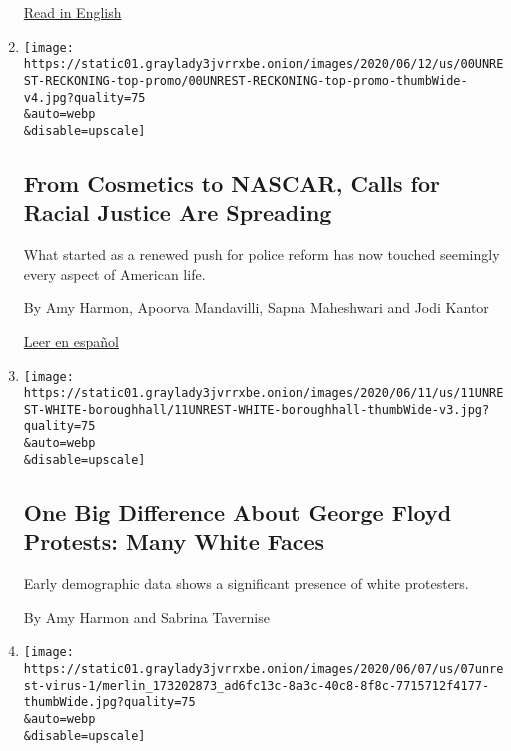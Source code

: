 \begin{enumerate}
  \href{https://www.nytimes3xbfgragh.onion/2020/06/13/us/george-floyd-racism-america.html}{Read
  in English}
\item
  \href{/2020/06/13/us/george-floyd-racism-america.html}{}

  \texttt{[image: https://static01.graylady3jvrrxbe.onion/images/2020/06/12/us/00UNREST-RECKONING-top-promo/00UNREST-RECKONING-top-promo-thumbWide-v4.jpg?quality=75\\\&auto=webp\\\&disable=upscale]}

  \hypertarget{from-cosmetics-to-nascar-calls-for-racial-justice-are-spreading}{%
  \subsection{From Cosmetics to NASCAR, Calls for Racial Justice Are
  Spreading}\label{from-cosmetics-to-nascar-calls-for-racial-justice-are-spreading}}

  What started as a renewed push for police reform has now touched
  seemingly every aspect of American life.

  By Amy Harmon, Apoorva Mandavilli, Sapna Maheshwari and Jodi Kantor

  \href{https://www.nytimes3xbfgragh.onion/es/2020/06/15/espanol/mundo/racismo-george-floyd-protestas.html}{Leer
  en español}
\item
  \href{/2020/06/12/us/george-floyd-white-protesters.html}{}

  \texttt{[image: https://static01.graylady3jvrrxbe.onion/images/2020/06/11/us/11UNREST-WHITE-boroughhall/11UNREST-WHITE-boroughhall-thumbWide-v3.jpg?quality=75\\\&auto=webp\\\&disable=upscale]}

  \hypertarget{one-big-difference-about-george-floyd-protests-many-white-faces}{%
  \subsection{One Big Difference About George Floyd Protests: Many White
  Faces}\label{one-big-difference-about-george-floyd-protests-many-white-faces}}

  Early demographic data shows a significant presence of white
  protesters.

  By Amy Harmon and Sabrina Tavernise
\item
  \href{/2020/06/07/us/Protest-coronavirus-george-floyd.html}{}

  \texttt{[image: https://static01.graylady3jvrrxbe.onion/images/2020/06/07/us/07unrest-virus-1/merlin\_173202873\_ad6fc13c-8a3c-40c8-8f8c-7715712f4177-thumbWide.jpg?quality=75\\\&auto=webp\\\&disable=upscale]}


\end{enumerate}
